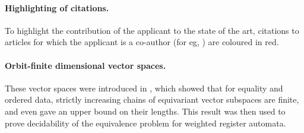 \documentclass[a4paper,11pt]{article}
\begin{document}
\paragraph*{Highlighting of citations.}
%
To highlight the contribution of the applicant to the state of the art,
citations to articles for which the applicant is a co-author (for eg, ) are coloured in red.
%
%
%
%
\paragraph*{Orbit-finite dimensional vector spaces.}
These vector spaces were introduced in \cite{BKM21},
which showed that for equality and ordered data, strictly increasing chains of equivariant vector subspaces are finite,
and even gave an upper bound on their lengths.
This result was then used to prove decidability of the equivalence problem for weighted register automata.
\end{document}
